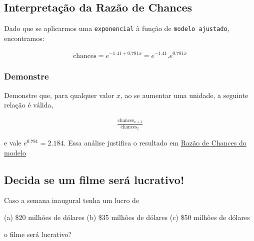 \documentclass[11pt]{article}
\begin{document}
\subsection{Interpretação da Razão de Chances}
\label{sec:org13da156}
Dado que se aplicarmos uma \texttt{exponencial} à função de \texttt{modelo ajustado},
encontramos:

\begin{equation}
  \begin{aligned}
    \textrm{chances} = e^{-1.41+0.781x}=e^{-1.41}.e^{0.781x}
  \end{aligned}
\end{equation}
\subsubsection{Demonstre}
\label{sec:org353b7e1}
Demonstre que, para qualquer valor \(x\), ao se aumentar uma
unidade, a seguinte relação é válida,

\begin{equation}
  \begin{aligned}
    \frac{\textrm{chances}_{x+1}}{\textrm{chances}_{x}}
  \end{aligned}
\end{equation}

e vale \(e^{0.781}=2.184\). Essa análise justifica o resultado em \hyperref[sec:org277fdbf]{Razão de Chances do modelo}

\subsection{Decida se um filme será lucrativo!}
\label{sec:orgb0ff9c3}
Caso a semana inaugural tenha um lucro de

(a) \$20 milhões de dólares
(b) \$35 milhões de dólares
(c) \$50 milhões de dólares

o filme será lucrativo?
\end{document}
